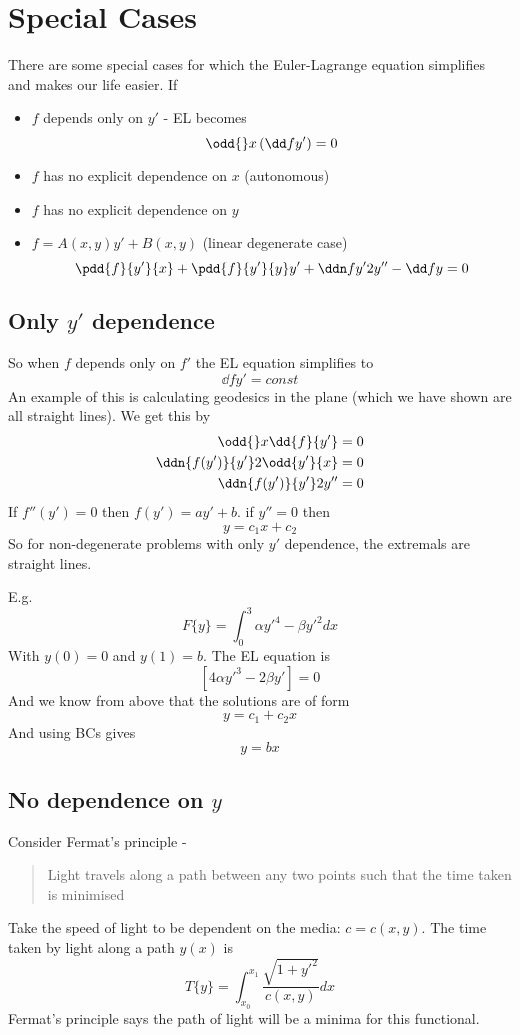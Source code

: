 \documentclass{E:/Documents/Latex/myassignment}
\begin{document}
\section{Special Cases}
There are some special cases for which the Euler-Lagrange equation simplifies and makes our life easier. If
\begin{itemize}
	\item $f$ depends only on $y'$ - EL becomes
	\[\odd{}x \left(\dd f{y'}\right) = 0\]
	\item $f$ has no explicit dependence on $x$ (autonomous) 
	\item $f$ has no explicit dependence on $y$ 
	\item $f = A(x,y)y' + B(x,y)$ (linear degenerate case)
	\[\pdd{f}{y'}{x} + \pdd{f}{y'}{y} y' + \ddn f{y'}2 y'' - \dd fy = 0\] 
\end{itemize}

\subsection{Only $y'$ dependence}
So when $f$ depends only on $f'$ the EL equation simplifies to
\[\dd f{y'} = const\]
An example of this is calculating geodesics in the plane (which we have shown are all straight lines).
We get this by
\begin{align*}
	\odd{}x \dd{f}{y'} =0\\
	\ddn{f(y')}{y'}2 \odd{y'}{x} = 0\\
	\ddn{f(y')}{y'}2 y'' = 0\\
\end{align*}
If $f''(y') = 0$ then $f(y') = ay' +b$. if $y'' = 0$ then
\[y = c_1 x + c_2\]
So for non-degenerate problems with only $y'$ dependence, the extremals are straight lines.

E.g.
\[F\{y\} = \int_0^3 \alpha y'^4 - \beta y'^2 dx\]
With $y(0) = 0$ and $y(1) = b$. The EL equation is
\[ \left[4 \alpha y'^3 - 2 \beta y'\right] = 0\]
And we know from above that the solutions are of form
\[y = c_1 + c_2x\]
And using BCs gives
\[y = bx\]

\subsection{No dependence on $y$}
Consider Fermat's principle - 
\begin{quote}
	Light travels along a path between any two points such that the time taken is minimised
\end{quote}
Take the speed of light to be dependent on the media: $c = c(x,y)$. The time taken by light along a path $y(x)$ is
\[T\{y\} = \int_{x_0}^{x_1} \frac{\sqrt{1+y'^2}}{c(x,y)} dx\]
Fermat's principle says the path of light will be a minima for this functional.
\end{document}
